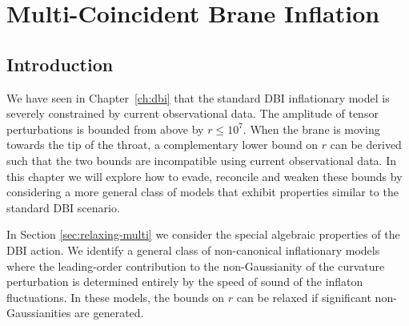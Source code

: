 \renewcommand{\CVSrevision}{\version$Id: multibrane.tex,v 1.63 2009/12/07 16:43:29 ith Exp $}

\chapter{Multi-Coincident Brane Inflation}
\label{ch:multibrane}

\section{Introduction}
\label{sec:intro-multi}
We have seen in Chapter~\ref{ch:dbi} that the standard DBI inflationary model
is severely constrained by current observational data. The amplitude of tensor
perturbations is bounded from above by $r\le 10^7$. When the brane is moving
towards the tip of the throat, a complementary lower bound
on $r$ can be derived such that the two bounds are incompatible using
current observational data. In this chapter we will explore
how to evade, reconcile and weaken these bounds by considering a more general
class of models that exhibit properties similar to the standard DBI scenario.


In Section \ref{sec:relaxing-multi} we consider the special algebraic
properties of the DBI action.
We identify a general class of non-canonical inflationary models
where the leading-order contribution to the non-Gaussianity of the 
curvature perturbation is determined 
entirely by the speed of sound of the inflaton fluctuations. 
In these models, the bounds on $r$ can be relaxed 
if significant non-Gaussianities are generated.


